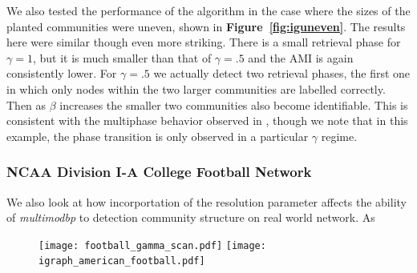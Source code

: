 \documentclass[11pt]{article}
\begin{document}
We also tested the performance of the algorithm in the case where the sizes of the planted communities were uneven, shown in \textbf{Figure~\ref{fig:iguneven}}.  The results here were similar though even more striking.  There is a small retrieval phase for $\gamma=1$, but it is much smaller than that of $\gamma=.5$ and the AMI is again consistently lower.  For $\gamma=.5$ we actually detect two retrieval phases, the first one in which only nodes within the two larger communities are labelled correctly.  Then as $\beta$ increases the smaller two communities also become identifiable.  This is consistent with the multiphase behavior observed in \cite{Schulke:2015hq}, though we note that in this example, the phase transition is only observed in a particular $\gamma$ regime.

\subsubsection{ NCAA Division I-A College Football Network }
 
 We also look at how incorportation of the resolution parameter affects the ability of \textit{multimodbp} to detection community structure on real world network.  As 
     
 \begin{figure}[!htbp]
\begin{center}
	\begin{mdframed}
		\texttt{[image: football\_gamma\_scan.pdf]}
		\texttt{[image: igraph\_american\_football.pdf]}
	\end{mdframed}
\caption{ \label{fig:footballgamma}}
\end{center}
\end{figure}   
\end{document}
